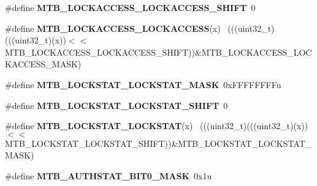 \begin{DoxyCompactItemize}
\item 
\hypertarget{group___m_t_b___register___masks_ga7417a26e29a0d9667c59ce74044f210b}{}\#define {\bfseries M\+T\+B\+\_\+\+L\+O\+C\+K\+A\+C\+C\+E\+S\+S\+\_\+\+L\+O\+C\+K\+A\+C\+C\+E\+S\+S\+\_\+\+S\+H\+I\+F\+T}~0\label{group___m_t_b___register___masks_ga7417a26e29a0d9667c59ce74044f210b}

\item 
\hypertarget{group___m_t_b___register___masks_ga616f7f3b45ed60b56f5a5427730a82d5}{}\#define {\bfseries M\+T\+B\+\_\+\+L\+O\+C\+K\+A\+C\+C\+E\+S\+S\+\_\+\+L\+O\+C\+K\+A\+C\+C\+E\+S\+S}(x)                      ~(((uint32\+\_\+t)(((uint32\+\_\+t)(x))$<$$<$M\+T\+B\+\_\+\+L\+O\+C\+K\+A\+C\+C\+E\+S\+S\+\_\+\+L\+O\+C\+K\+A\+C\+C\+E\+S\+S\+\_\+\+S\+H\+I\+F\+T))\&M\+T\+B\+\_\+\+L\+O\+C\+K\+A\+C\+C\+E\+S\+S\+\_\+\+L\+O\+C\+K\+A\+C\+C\+E\+S\+S\+\_\+\+M\+A\+S\+K)\label{group___m_t_b___register___masks_ga616f7f3b45ed60b56f5a5427730a82d5}

\item 
\hypertarget{group___m_t_b___register___masks_ga8844dcbc4d3c0a3dcbb3ced21e84b950}{}\#define {\bfseries M\+T\+B\+\_\+\+L\+O\+C\+K\+S\+T\+A\+T\+\_\+\+L\+O\+C\+K\+S\+T\+A\+T\+\_\+\+M\+A\+S\+K}~0x\+F\+F\+F\+F\+F\+F\+F\+Fu\label{group___m_t_b___register___masks_ga8844dcbc4d3c0a3dcbb3ced21e84b950}

\item 
\hypertarget{group___m_t_b___register___masks_ga198cb66f9e01cde28d71dfab52f7b66c}{}\#define {\bfseries M\+T\+B\+\_\+\+L\+O\+C\+K\+S\+T\+A\+T\+\_\+\+L\+O\+C\+K\+S\+T\+A\+T\+\_\+\+S\+H\+I\+F\+T}~0\label{group___m_t_b___register___masks_ga198cb66f9e01cde28d71dfab52f7b66c}

\item 
\hypertarget{group___m_t_b___register___masks_gaffb429667c6addf1023ea5b2b7fd02a5}{}\#define {\bfseries M\+T\+B\+\_\+\+L\+O\+C\+K\+S\+T\+A\+T\+\_\+\+L\+O\+C\+K\+S\+T\+A\+T}(x)                              ~(((uint32\+\_\+t)(((uint32\+\_\+t)(x))$<$$<$M\+T\+B\+\_\+\+L\+O\+C\+K\+S\+T\+A\+T\+\_\+\+L\+O\+C\+K\+S\+T\+A\+T\+\_\+\+S\+H\+I\+F\+T))\&M\+T\+B\+\_\+\+L\+O\+C\+K\+S\+T\+A\+T\+\_\+\+L\+O\+C\+K\+S\+T\+A\+T\+\_\+\+M\+A\+S\+K)\label{group___m_t_b___register___masks_gaffb429667c6addf1023ea5b2b7fd02a5}

\item 
\hypertarget{group___m_t_b___register___masks_gaa148665a7a3f112c47167991fefb5dbd}{}\#define {\bfseries M\+T\+B\+\_\+\+A\+U\+T\+H\+S\+T\+A\+T\+\_\+\+B\+I\+T0\+\_\+\+M\+A\+S\+K}~0x1u\label{group___m_t_b___register___masks_gaa148665a7a3f112c47167991fefb5dbd}


\end{DoxyCompactItemize}
